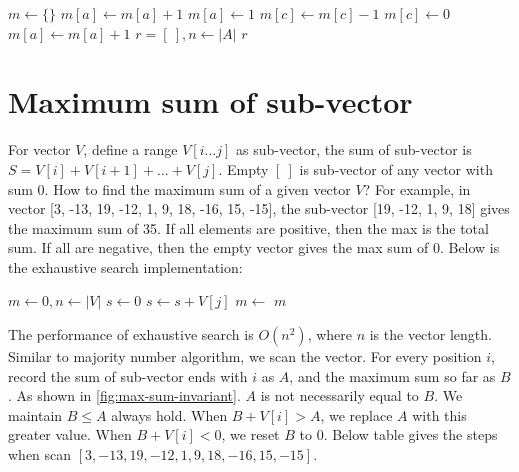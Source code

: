 \documentclass[b5paper]{article}
\begin{document}
\begin{Answer}[ref = {ex:majority-problem}]
{\begin{algorithmic}[1]
\State $m \gets \{\}$
    \State $m[a] \gets m[a] + 1$
    \State $m[a] \gets 1$
  \Else
      \State $m[c] \gets m[c] - 1$
        \State {}
      \EndIf
    \EndFor
  \EndIf
\EndFor
{}
  \State $m[c] \gets 0$
\EndFor
{} 
    \State $m[a] \gets m[a] + 1$
  \EndIf
\EndFor
\State $r = [\ ], n \gets |A|$
    \State {}
  \EndIf
\EndFor
\State \Return $r$
\EndFunction
\end{algorithmic}
}
\end{Answer}

\section{Maximum sum of sub-vector}

For vector $V$, define a range $V[i...j]$ as sub-vector, the sum of sub-vector is $S = V[i] + V[i+1] + ... + V[j]$. Empty $[\ ]$ is sub-vector of any vector with sum 0. How to find the maximum sum of a given vector $V$\cite{Bentley}? For example, in vector [3, -13, 19, -12, 1, 9, 18, -16, 15, -15], the sub-vector [19, -12, 1, 9, 18] gives the maximum sum of 35. If all elements are positive, then the max is the total sum. If all are negative, then the empty vector gives the max sum of 0. Below is the exhaustive search implementation:

\begin{algorithmic}[1]
  \State $m \gets 0, n \gets |V|$
    \State $s \gets 0$
      \State $s \gets s + V[j]$
      \State $m \gets $ 
    \EndFor
  \EndFor
  \State \Return $m$
\EndFunction
\end{algorithmic}

The performance of exhaustive search is $O(n^2)$, where $n$ is the vector length. Similar to majority number algorithm, we scan the vector. For every position $i$, record the sum of sub-vector ends with $i$ as $A$, and the maximum sum so far as $B$. As shown in \cref{fig:max-sum-invariant}. $A$ is not necessarily equal to $B$. We maintain $B \leq A$ always hold. When $B + V[i] > A$, we replace $A$ with this greater value. When $B + V[i] < 0$, we reset $B$ to 0. Below table gives the steps when scan $[3, -13, 19, -12, 1, 9, 18, -16, 15, -15]$.
\end{document}
